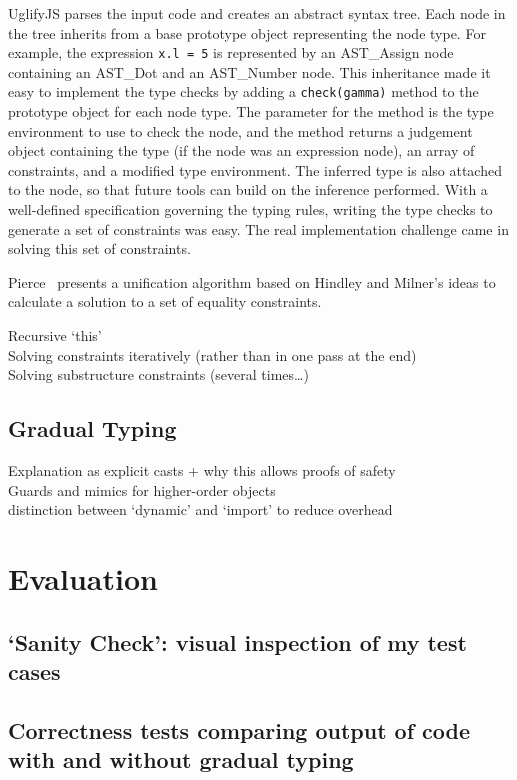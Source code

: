 \documentclass[12pt,a4paper,twoside,openright]{report}
\newcommand*{\js}{\texttt}
\begin{document}
UglifyJS parses the input code and creates an abstract syntax tree. Each node
in the tree inherits from a base prototype object representing the node type.
For example, the expression \js{x.l = 5} is represented by an AST\_Assign node
containing an AST\_Dot and an AST\_Number node. This inheritance made it easy
to implement the type checks by adding a \js{check(gamma)} method to the
prototype object for each node type. The parameter for the method is the type
environment to use to check the node, and the method returns a judgement object
containing the type (if the node was an expression node), an array of
constraints, and a modified type environment. The inferred type is also
attached to the node, so that future tools can build on the inference
performed. With a well-defined specification governing the typing rules, writing the type
checks to generate a set of constraints was easy. The real implementation
challenge came in solving this set of constraints.

Pierce~\cite{pierce} presents a unification algorithm based on Hindley and
Milner's ideas to calculate a solution to a set of equality constraints.


Recursive `this' \\
Solving constraints iteratively (rather than in one pass at the end) \\
Solving substructure constraints (several times\ldots) \\

\section{Gradual Typing}
Explanation as explicit casts + why this allows proofs of safety \\
Guards and mimics for higher-order objects \\
distinction between `dynamic' and `import' to reduce overhead \\

\printbibliography{}

\chapter{Evaluation}\label{evaluation}
\section{`Sanity Check': visual inspection of my test cases}
\section{Correctness tests comparing output of code with and without gradual typing}
\end{document}
